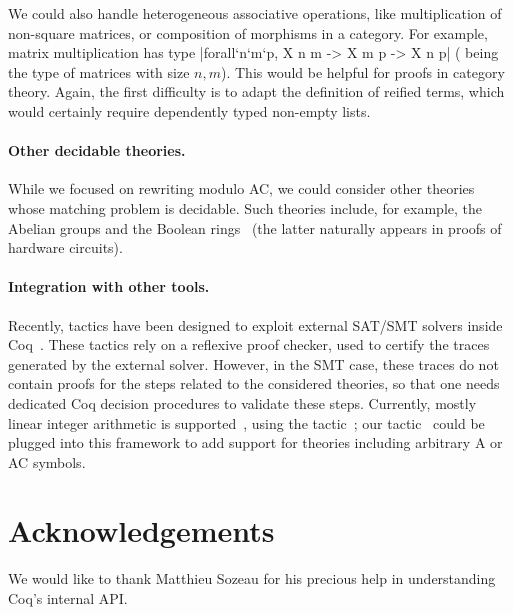 \documentclass{llncs}
\begin{document}
We could also handle heterogeneous associative operations, like
multiplication of non-square matrices, or composition of morphisms in
a category. For example, matrix multiplication has type
\coqinline|forall`n`m`p, X n m -> X m p -> X n p| ( being
the type of matrices with size $n,m$). This would be helpful for
proofs in category theory. Again, the first difficulty is to adapt the
definition of reified terms, which would certainly require dependently
typed non-empty lists.

\paragraph{Other decidable theories.} 

While we focused on rewriting modulo AC, we could consider other
theories whose matching problem is decidable. Such theories include,
for example, the Abelian groups and the Boolean rings~\cite{boudet-89}
(the latter naturally appears in proofs of hardware circuits).

\paragraph{Integration with other tools.}

Recently, tactics have been designed to exploit external SAT/SMT
solvers inside Coq~\cite{SMTCoq}. These tactics rely on a reflexive
proof checker, used to certify the traces generated by the external
solver. However, in the SMT case, these traces do not contain proofs
for the steps related to the considered theories, so that one needs
dedicated Coq decision procedures to validate these steps. Currently,
mostly linear integer arithmetic is supported~\cite{SMTCoq}, using the
 tactic~\cite{lia}; our tactic \aacreflexivity\ could be
plugged into this framework to add support for theories including
arbitrary A or AC symbols.

\section*{Acknowledgements}

We would like to thank Matthieu Sozeau for his precious help in
understanding Coq's internal API.


\end{document}
